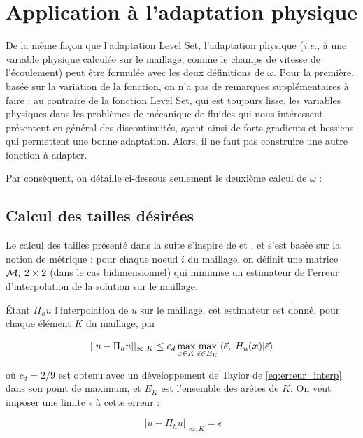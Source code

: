 
\section{Application à l'adaptation physique}
\label{sec:adapPhysique}

\indent De la même façon que l'adaptation Level Set, l'adaptation physique (\emph{i.e.}, à une variable physique calculée sur le maillage, comme le champs de vitesse de l'écoulement) peut être formulée avec les deux définitions de \(\omega\). Pour la première, basée sur la variation de la fonction, on n'a pas de remarques supplémentaires à faire : au contraire de la fonction Level Set, qui est toujours lisse, les variables physiques dans les problèmes de mécanique de fluides qui nous intéressent présentent en général des discontinuités, ayant ainsi de forts gradients et hessiens qui permettent une bonne adaptation. Alors, il ne faut pas construire une autre fonction à adapter. 

\indent Par conséquent, on détaille ci-dessous seulement le deuxième calcul de \(\omega\) :

\subsection{Calcul des tailles désirées}

\indent Le calcul des tailles présenté dans la suite s'inspire de \cite{cecile_these} et \cite{frey_alauzet}, et s'est basée sur la notion de métrique : pour chaque noeud \(i\) du maillage, on définit une matrice \(\met_i \ 2 \times 2\) (dans le cas bidimensionnel) qui minimise un estimateur de l'erreur d'interpolation de la solution sur le maillage.

\indent Étant \(\Pi_hu\) l'interpolation de \(u\) sur le maillage, cet estimateur est donné, pour chaque élément \(K\) du maillage, par

\begin{equation}
	\label{eq:erreur_interp}
	||u-\Pi_hu||_{\infty,K} \leq c_d \max_{x \in K}{\max_{\vec{e} \in E_K}{\langle \vec{e}, |H_u(\boldsymbol{x})| \vec{e} \rangle}}
\end{equation}

\noindent où \(c_d = 2/9 \) est obtenu avec un développement de Taylor de \eqref{eq:erreur_interp} dans son point de maximum, et $E_K$ est l'ensemble des arêtes de $K$. On veut imposer une  limite \(\epsilon\) à cette erreur : 

\begin{equation*}
	||u-\Pi_hu||_{\infty,K} = \epsilon
\end{equation*}

